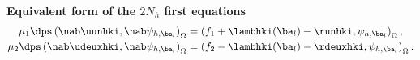 \documentclass[10 pt]{beamer}
\begin{document}
\begin{frame}
%
\textbf{Equivalent form of the $2N_h$ first equations}
\begin{align*}
\nonumber\mu_1\dps \left(\nab \uunhki, \nab \psi_{h,{{\ba}_l}}\right)_{\Omega}&=\left(f_1+\lambhki({{\ba}_l})-\runhki,\psi_{h,\ba_l}\right)_{\Omega},\\
\mu_2 \dps \left(\nab \udeuxhki, \nab \psi_{h,{{\ba}_l}}\right)_{\Omega}&=    \left(f_2-\lambhki({{\ba}_l})-\rdeuxhki, \psi_{h,{\ba}_l}\right)_{\Omega}.
\label{eq:variational:formulation:inexacte_newton}
\end{align*}
\end{frame}
\end{document}
